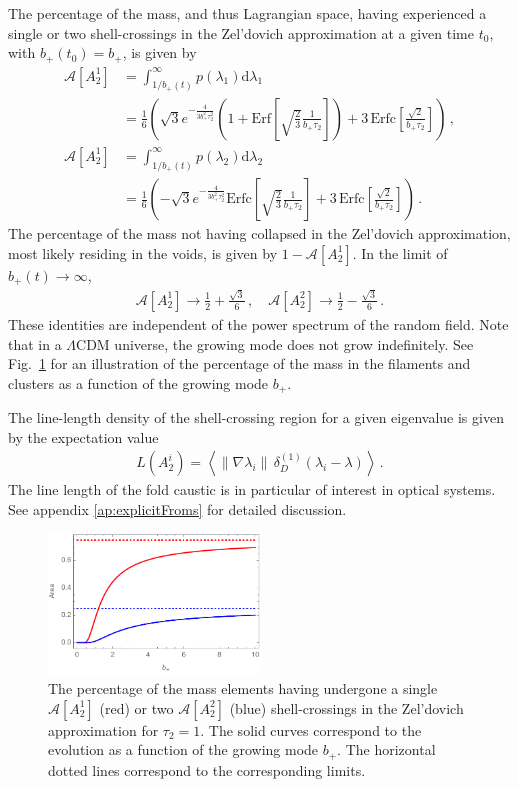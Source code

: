 \documentclass[a4paper, 11pt]{article}
\begin{document}
The percentage of the mass, and thus Lagrangian space, having experienced a single or two shell-crossings in the Zel'dovich approximation at a given time $t_0$, with $b_+(t_0)=b_+$, is given by
\begin{align}
\mathcal{A}[A_2^1] 
&= \int_{1/b_+(t)}^\infty p(\lambda_1) \mathrm{d}\lambda_1\nonumber\\
&= \frac{1}{6}\left(
\sqrt{3}e^{-\frac{4}{3b_+^2\tau_2^2}}\left(1+\text{Erf}\left[\sqrt{\frac{2}{3}}\frac{1}{b_+\tau_2}\right]\right) + 3 \,\text{Erfc}\left[\frac{\sqrt{2}}{b_+ \tau_2}\right]
\right)\,,\\
\mathcal{A}[A_2^1] 
&= \int_{1/b_+(t)}^\infty p(\lambda_2) \mathrm{d}\lambda_2\nonumber\\
&= \frac{1}{6}\left(
-\sqrt{3}e^{-\frac{4}{3b_+^2\tau_2^2}}\text{Erfc}\left[\sqrt{\frac{2}{3}}\frac{1}{b_+\tau_2}\right] + 3 \,\text{Erfc}\left[\frac{\sqrt{2}}{b_+ \tau_2}\right]\right)\,.
\end{align}
The percentage of the mass not having collapsed in the Zel'dovich approximation, most likely residing in the voids, is given by $1-\mathcal{A}[A_2^1]$. In the limit of $b_+(t) \to \infty$, 
\begin{align}
\mathcal{A}[A_2^1]  \to \frac{1}{2} + \frac{\sqrt{3}}{6}\,,\quad
\mathcal{A}[A_2^2]  \to \frac{1}{2} - \frac{\sqrt{3}}{6}\,.
\end{align}
These identities are independent of the power spectrum of the random field. Note that in a $\Lambda$CDM universe, the growing mode does not grow indefinitely. See Fig.\ \ref{fig:A2} for an illustration of the percentage of the mass in the filaments and clusters as a function of the growing mode $b_+$.

The line-length density of the shell-crossing region for a given eigenvalue is given by the expectation value
\begin{align}
L(A_2^i) = \left\langle \| \nabla \lambda_i\|\, \delta_D^{(1)}(\lambda_i - \lambda)\right \rangle\,.
\end{align}
The line length of the fold caustic is in particular of interest in optical systems. See appendix \ref{ap:explicitFroms} for detailed discussion.


\begin{figure}
\centering
\includegraphics[width=0.5\textwidth]{A2Area}
\caption{The percentage of the mass elements having undergone a single $\mathcal{A}[A_2^1]$ (red) or two $\mathcal{A}[A_2^2]$ (blue) shell-crossings in the Zel'dovich approximation for $\tau_2=1$. The solid curves correspond to the evolution as a function of the growing mode $b_+$. The horizontal dotted lines correspond to the corresponding limits.}
\label{fig:A2}
\end{figure}
\end{document}
